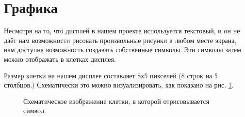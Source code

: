 \documentclass[../sparc.tex]{subfiles}
\begin{document}
\section{Графика}

Несмотря на то, что дисплей в нашем проекте используется текстовый, и он не даёт
нам возможности рисовать произвольные рисунки в любом месте экрана, нам доступна
возможность создавать собственные символы.  Эти символы затем можно отображать в
клетках дисплея.

Размер клетки на нашем дисплее составляет 8х5 пикселей (8 строк на 5 столбцов.)
Схематически это можно визуализировать, как показано на
рис. \ref{fig:game-dev-char}.

\begin{figure}[ht]
  \centering
  \caption{Схематическое изображение клетки, в которой отрисовывается символ.}
  \label{fig:game-dev-char}
\end{figure}
\end{document}

